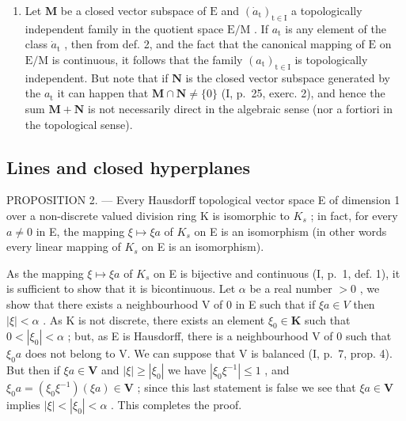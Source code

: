 \begin{enumerate}
\def\labelenumi{\arabic{enumi})}
\setcounter{enumi}{1}
\tightlist
\item
  Let \(\mathbf{M}\) be a closed vector subspace of \(\mathrm{E}\) and \((\dot{a}_{\mathrm{t}})_{\mathrm{t}\in \mathrm{I}}\) a topologically independent family in the quotient space \(\mathrm{E / M}\) . If \(a_{\mathrm{t}}\) is any element of the class \(\dot{a}_{\mathrm{t}}\) , then from def. 2, and the fact that the canonical mapping of \(\mathrm{E}\) on \(\mathrm{E / M}\) is continuous, it follows that the family \((a_{\mathrm{t}})_{\mathrm{t}\in \mathrm{I}}\) is topologically independent. But note that if \(\mathbf{N}\) is the closed vector subspace generated by the \(a_{\mathrm{t}}\) it can happen that \(\mathbf{M} \cap \mathbf{N} \neq \{0\}\) (I, p.~25, exerc. 2), and hence the sum \(\mathbf{M} + \mathbf{N}\) is not necessarily direct in the algebraic sense (nor a fortiori in the topological sense).
\end{enumerate}

\subsection{Lines and closed hyperplanes}

PROPOSITION 2. --- Every Hausdorff topological vector space E of dimension 1 over a non-discrete valued division ring K is isomorphic to \(K_{s}\) ; in fact, for every \(a \neq 0\) in E, the mapping \(\xi \mapsto \xi a\) of \(K_{s}\) on E is an isomorphism (in other words every linear mapping of \(K_{s}\) on E is an isomorphism).

As the mapping \(\xi \mapsto \xi a\) of \(K_{s}\) on E is bijective and continuous (I, p.~1, def. 1), it is sufficient to show that it is bicontinuous. Let \(\alpha\) be a real number \(>0\) , we show that there exists a neighbourhood V of 0 in E such that if \(\xi a \in V\) then \(|\xi| < \alpha\) . As K is not discrete, there exists an element \(\xi_0 \in \mathbf{K}\) such that \(0 < |\xi_0| < \alpha\) ; but, as E is Hausdorff, there is a neighbourhood V of 0 such that \(\xi_0a\) does not belong to V. We can suppose that V is balanced (I, p.~7, prop. 4). But then if \(\xi a \in \mathbf{V}\) and \(|\xi| \geqslant |\xi_0|\) we have \(|\xi_0\xi^{-1}| \leqslant 1\) , and \(\xi_0a = (\xi_0\xi^{-1})(\xi a) \in \mathbf{V}\) ; since this last statement is false we see that \(\xi a \in \mathbf{V}\) implies \(|\xi| < |\xi_0| < \alpha\) . This completes the proof.

